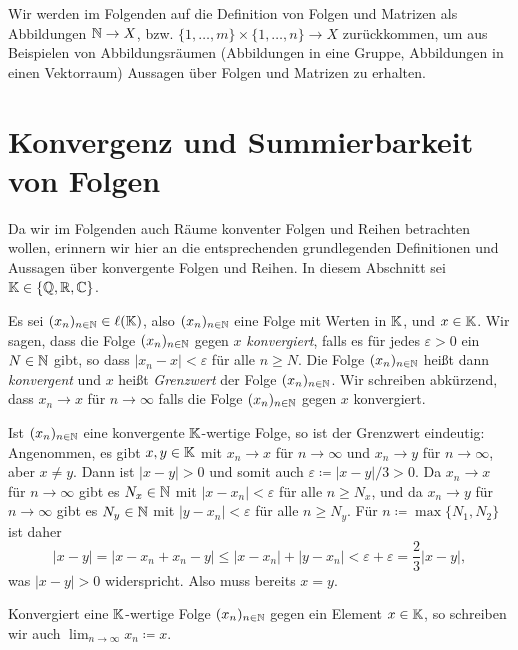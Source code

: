 \begin{bem}
 Wir werden im Folgenden auf die Definition von Folgen und Matrizen als Abbildungen $\mathbb{N} \to X$, bzw. $\{1, \dotsc, m\} \times \{1, \dotsc, n\} \to X$ zurückkommen, um aus Beispielen von Abbildungsräumen (Abbildungen in eine Gruppe, Abbildungen in einen Vektorraum) Aussagen über Folgen und Matrizen zu erhalten.
\end{bem}





\section{Konvergenz und Summierbarkeit von Folgen}
Da wir im Folgenden auch Räume konventer Folgen und Reihen betrachten wollen, erinnern wir hier an die entsprechenden grundlegenden Definitionen und Aussagen über konvergente Folgen und Reihen. In diesem Abschnitt sei $\mathbb{K} \in \{\mathbb{Q}, \mathbb{R}, \mathbb{C}\}$.


\begin{defi}
 Es sei $(x_n)_{n \in \mathbb{N}} \in \ell(\mathbb{K})$, also $(x_n)_{n \in \mathbb{N}}$ eine Folge mit Werten in $\mathbb{K}$, und $x \in \mathbb{K}$. Wir sagen, dass die Folge $(x_n)_{n \in \mathbb{N}}$ gegen $x$ \emph{konvergiert}, falls es für jedes $\varepsilon > 0$ ein $N \in \mathbb{N}$ gibt, so dass $|x_n - x| < \varepsilon$ für alle $n \geq N$. Die Folge $(x_n)_{n \in \mathbb{N}}$ heißt dann \emph{konvergent} und $x$ heißt \emph{Grenzwert} der Folge $(x_n)_{n \in \mathbb{N}}$. Wir schreiben abkürzend, dass $x_n \to x$ für $n \to \infty$ falls die Folge $(x_n)_{n \in \mathbb{N}}$ gegen $x$ konvergiert.
\end{defi}


\begin{bem}
 Ist $(x_n)_{n \in \mathbb{N}}$ eine konvergente $\mathbb{K}$-wertige Folge, so ist der Grenzwert eindeutig: Angenommen, es gibt $x,y \in \mathbb{K}$ mit $x_n \to x$ für $n \to \infty$ und $x_n \to y$ für $n \to \infty$, aber $x \neq y$. Dann ist $|x-y| > 0$ und somit auch $\varepsilon \coloneqq |x-y|/3 > 0$. Da $x_n \to x$ für $n \to \infty$ gibt es $N_x \in \mathbb{N}$ mit $|x-x_n| < \varepsilon$ für alle $n \geq N_x$, und da $x_n \to y$ für $n \to \infty$ gibt es $N_y \in \mathbb{N}$ mit $|y-x_n| < \varepsilon$ für alle $n \geq N_y$. Für $n \coloneqq \max \{N_1, N_2\}$ ist daher
 \[
  |x-y|
  = |x-x_n+x_n-y|
  \leq |x - x_n| + |y - x_n|
  < \varepsilon + \varepsilon
  = \frac{2}{3}|x-y|,
 \]
 was $|x-y| > 0$ widerspricht. Also muss bereits $x = y$.
 
 Konvergiert eine $\mathbb{K}$-wertige Folge $(x_n)_{n \in \mathbb{N}}$ gegen ein Element $x \in \mathbb{K}$, so schreiben wir auch $\lim_{n \to \infty} x_n \coloneqq x$.
\end{bem}


